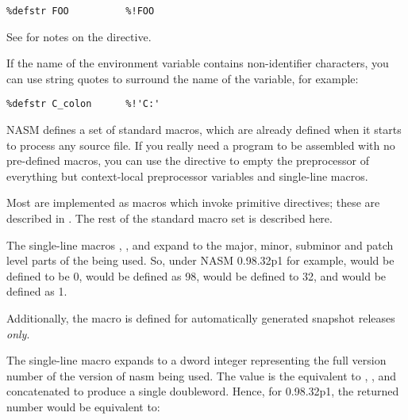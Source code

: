 \begin{lstlisting}
%defstr FOO          %!FOO
\end{lstlisting}

See  for notes on the  directive.

If the name of the environment variable contains non-identifier
characters, you can use string quotes to surround the name of the
variable, for example:

\begin{lstlisting}
%defstr C_colon      %!'C:'
\end{lstlisting}


NASM defines a set of standard macros, which are already defined
when it starts to process any source file. If you really need a
program to be assembled with no pre-defined macros, you can use the
 directive to empty the preprocessor of everything
but context-local preprocessor variables and single-line macros.

Most  are implemented as macros
which invoke primitive directives; these are described in .
The rest of the standard macro set is described here.


The single-line macros , ,
 and  expand to
the major, minor, subminor and patch level parts of the 
being used. So, under NASM 0.98.32p1 for example, 
would be defined to be 0,  would be defined as 98,
 would be defined to 32, and 
would be defined as 1.

Additionally, the macro  is defined for
automatically generated snapshot releases \emph{only}.


The single-line macro  expands to a dword integer
representing the full version number of the version of nasm being used.
The value is the equivalent to , ,
 and  concatenated to
produce a single doubleword. Hence, for 0.98.32p1, the returned number
would be equivalent to:

